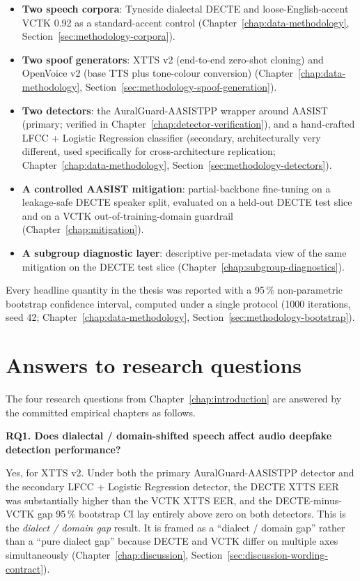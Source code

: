 \begin{itemize}
    \item \textbf{Two speech corpora}: Tyneside dialectal DECTE and
        loose-English-accent VCTK 0.92 as a standard-accent control
        (Chapter~\ref{chap:data-methodology}, Section~\ref{sec:methodology-corpora}).
    \item \textbf{Two spoof generators}: XTTS v2 (end-to-end zero-shot
        cloning) and OpenVoice v2 (base TTS plus tone-colour
        conversion) (Chapter~\ref{chap:data-methodology}, Section~\ref{sec:methodology-spoof-generation}).
    \item \textbf{Two detectors}: the AuralGuard-AASISTPP wrapper around
        AASIST (primary; verified in Chapter~\ref{chap:detector-verification}), and a hand-crafted
        LFCC + Logistic Regression classifier (secondary,
        architecturally very different, used specifically for
        cross-architecture replication; Chapter~\ref{chap:data-methodology}, Section~\ref{sec:methodology-detectors}).
    \item \textbf{A controlled AASIST mitigation}: partial-backbone
        fine-tuning on a leakage-safe DECTE speaker split, evaluated
        on a held-out DECTE test slice and on a VCTK
        out-of-training-domain guardrail (Chapter~\ref{chap:mitigation}).
    \item \textbf{A subgroup diagnostic layer}: descriptive per-metadata
        view of the same mitigation on the DECTE test slice
        (Chapter~\ref{chap:subgroup-diagnostics}).
\end{itemize}

Every headline quantity in the thesis was reported with a
95\,\% non-parametric bootstrap confidence interval, computed
under a single protocol (1000 iterations, seed 42; Chapter~\ref{chap:data-methodology},
Section~\ref{sec:methodology-bootstrap}).


\section{Answers to research questions}
\label{sec:conclusion-rq-answers}

The four research questions from Chapter~\ref{chap:introduction} are answered by the
committed empirical chapters as follows.

\textbf{RQ1. Does dialectal / domain-shifted speech affect audio
deepfake detection performance?}

Yes, for XTTS v2. Under both the primary AuralGuard-AASISTPP
detector and the secondary LFCC + Logistic Regression detector,
the DECTE XTTS EER was substantially higher than the VCTK XTTS
EER, and the DECTE-minus-VCTK gap 95\,\% bootstrap CI lay entirely
above zero on both detectors. This is the \emph{dialect / domain gap}
result. It is framed as a ``dialect / domain gap'' rather than a
``pure dialect gap'' because DECTE and VCTK differ on multiple
axes simultaneously (Chapter~\ref{chap:discussion}, Section~\ref{sec:discussion-wording-contract}).

